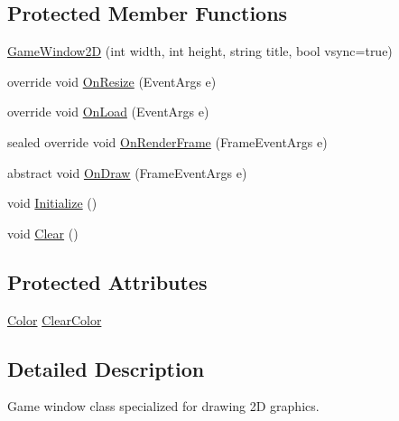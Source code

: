 \subsection*{Protected Member Functions}
\begin{DoxyCompactItemize}
\item 
\hyperlink{class_tri_devs_1_1_tri_engine2_d_1_1_game_window2_d_ab7d788fd5b792584a2c27db9da82ec76}{Game\-Window2\-D} (int width, int height, string title, bool vsync=true)
\item 
override void \hyperlink{class_tri_devs_1_1_tri_engine2_d_1_1_game_window2_d_a0bdb065bfc10d4cff8e1098c03ece809}{On\-Resize} (Event\-Args e)
\item 
override void \hyperlink{class_tri_devs_1_1_tri_engine2_d_1_1_game_window2_d_ae1e61b87586963253506e11f22b5eb17}{On\-Load} (Event\-Args e)
\item 
sealed override void \hyperlink{class_tri_devs_1_1_tri_engine2_d_1_1_game_window2_d_a35d70be9b4ec0b954c3aba906082b646}{On\-Render\-Frame} (Frame\-Event\-Args e)
\item 
abstract void \hyperlink{class_tri_devs_1_1_tri_engine2_d_1_1_game_window2_d_a8a06f4d94a089e61629e35180776e77f}{On\-Draw} (Frame\-Event\-Args e)
\item 
void \hyperlink{class_tri_devs_1_1_tri_engine2_d_1_1_game_window2_d_a477cbe1722190a184c0031bc71534d7a}{Initialize} ()
\item 
void \hyperlink{class_tri_devs_1_1_tri_engine2_d_1_1_game_window2_d_a2784f5a0665ffb50aae5e528f6079817}{Clear} ()
\end{DoxyCompactItemize}
\subsection*{Protected Attributes}
\begin{DoxyCompactItemize}
\item 
\hyperlink{struct_tri_devs_1_1_tri_engine2_d_1_1_color}{Color} \hyperlink{class_tri_devs_1_1_tri_engine2_d_1_1_game_window2_d_a9294fb4c57b9860db106801f8eb5fa0d}{Clear\-Color}
\end{DoxyCompactItemize}


\subsection{Detailed Description}
Game window class specialized for drawing 2\-D graphics. 



